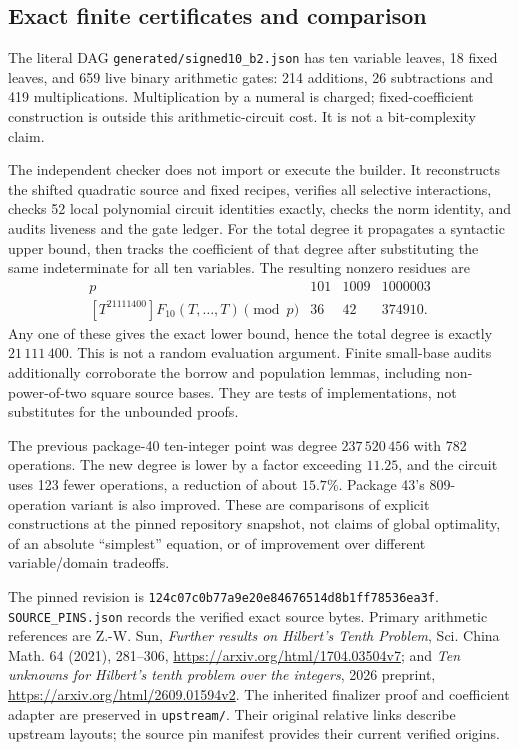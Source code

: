 \subsection{Exact finite certificates and comparison}

The literal DAG \texttt{generated/signed10\_b2.json} has ten variable
leaves, 18 fixed leaves, and 659 live binary arithmetic gates:
214 additions, 26 subtractions and 419 multiplications. Multiplication
by a numeral is charged; fixed-coefficient construction is outside this
arithmetic-circuit cost. It is not a bit-complexity claim.

The independent checker does not import or execute the builder. It
reconstructs the shifted quadratic source and fixed recipes, verifies
all selective interactions, checks 52 local polynomial circuit identities
exactly, checks the norm identity, and audits liveness and the gate ledger.
For the total degree it propagates a syntactic upper bound, then tracks
the coefficient of that degree after substituting the same indeterminate
for all ten variables. The resulting nonzero residues are
\[
 \begin{array}{c|ccc}
 p&101&1009&1000003\\\hline
 [T^{21111400}]F_{10}(T,\ldots,T)\pmod p&36&42&374910.
 \end{array}
\]
Any one of these gives the exact lower bound, hence the total degree is
exactly $21\,111\,400$. This is not a random evaluation argument.
Finite small-base audits additionally corroborate the borrow and
population lemmas, including non-power-of-two square source bases.
They are tests of implementations, not substitutes for the unbounded proofs.

The previous package-40 ten-integer point was degree $237\,520\,456$
with 782 operations. The new degree is lower by a factor exceeding
$11.25$, and the circuit uses 123 fewer operations, a reduction of about
$15.7\%$. Package 43's 809-operation variant is also improved. These are
comparisons of explicit constructions at the pinned repository snapshot,
not claims of global optimality, of an absolute ``simplest'' equation, or
of improvement over different variable/domain tradeoffs.

The pinned revision is
\texttt{124c07c0b77a9e20e84676514d8b1ff78536ea3f}.
\texttt{SOURCE\_PINS.json} records the verified exact source bytes.
Primary arithmetic references are Z.-W. Sun,
\emph{Further results on Hilbert's Tenth Problem}, Sci. China Math. 64
(2021), 281--306, \url{https://arxiv.org/html/1704.03504v7}; and
\emph{Ten unknowns for Hilbert's tenth problem over the integers},
2026 preprint, \url{https://arxiv.org/html/2609.01594v2}.
The inherited finalizer proof and coefficient adapter are preserved in
\texttt{upstream/}. Their original relative links describe upstream
layouts; the source pin manifest provides their current verified origins.

